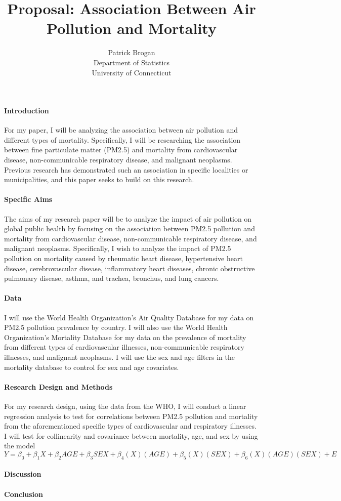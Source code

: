 \documentclass[12pt]{article}
\title{Proposal: Association Between Air Pollution and Mortality}
\author{Patrick Brogan\\
  Department of Statistics\\
  University of Connecticut
}
\begin{document}
\maketitle


\paragraph{Introduction}
For my paper, I will be analyzing the association between air pollution and different types of mortality. Specifically, I will be researching the association between fine particulate matter (PM2.5) and mortality from cardiovascular disease, non-communicable respiratory disease, and malignant neoplasms. Previous research has demonstrated such an association in specific localities or municipalities\citep{dockery1993association}\citep{sunyer1996air}\citep{jerrett2005spatial}, and this paper seeks to build on this research.

\paragraph{Specific Aims}
The aims of my research paper will be to analyze the impact of air pollution on global public health by focusing on the association between PM2.5 pollution and mortality from cardiovascular disease, non-communicable respiratory disease, and malignant neoplasms. Specifically, I wish to analyze the impact of PM2.5 pollution on mortality caused by rheumatic heart disease, hypertensive heart disease, cerebrovascular disease, inflammatory heart diseases, chronic obstructive pulmonary disease, asthma, and trachea, bronchus, and lung cancers.

\paragraph{Data}
I will use the World Health Organization's Air Quality Database for my data on PM2.5 pollution prevalence by country. I will also use the World Health Organization's Mortality Database for my data on the prevalence of mortality from different types of cardiovascular illnesses, non-communicable respiratory illnesses, and malignant neoplasms. I will use the sex and age filters in the mortality database to control for sex and age covariates.

\paragraph{Research Design and Methods}
For my research design, using the data from the WHO, I will conduct a linear regression analysis to test for correlations between PM2.5 pollution and mortality from the aforementioned specific types of cardiovascular and respiratory illnesses. I will test for collinearity and covariance between mortality, age, and sex by using the model
\[
  Y = \beta_{0} + \beta_{1}X + \beta_{2}AGE + \beta_{3}SEX + \beta_{4}(X)(AGE) + \beta_{5}(X)(SEX) + \beta_{6}(X)(AGE)(SEX) + E
\]

\paragraph{Discussion}
\lipsum[5]

\paragraph{Conclusion}
\lipsum[6]


\end{document}
